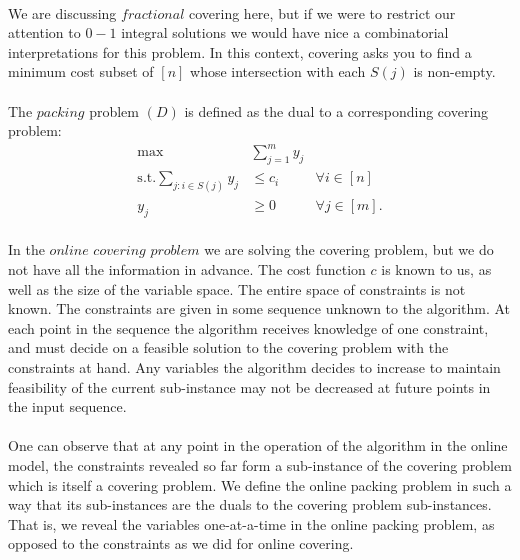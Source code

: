\documentclass[letterpaper,12pt,oneside,onecolumn]{article}
\begin{document}
\paragraph{}
We are discussing $\textit{fractional}$ covering here, but if we were to restrict our attention to $0-1$ integral solutions we would have nice a combinatorial interpretations for this problem. In this context, covering asks you to find a minimum cost subset of $[n]$ whose intersection with each $S(j)$ is non-empty.
\paragraph{}
The $\textit{packing}$ problem $(D)$ is defined as the dual to a corresponding covering problem:
\begin{align*}
\max &\sum_{j=1}^m y_j \\
\text{s.t.} \sum_{j : i \in S(j)} y_j &\leq c_i &\forall i \in [n] \\
y_j &\geq 0 &\forall j \in [m].
\end{align*}
\paragraph{}
In the $\textit{online covering problem}$ we are solving the covering problem, but we do not have all the information in advance. The cost function $c$ is known to us, as well as the size of the variable space. The entire space of constraints is not known. The constraints are given in some sequence unknown to the algorithm. At each point in the sequence the algorithm receives knowledge of one constraint, and must decide on a feasible solution to the covering problem with the constraints at hand. Any variables the algorithm decides to increase to maintain feasibility of the current sub-instance may not be decreased at future points in the input sequence.
\paragraph{}
One can observe that at any point in the operation of the algorithm in the online model, the constraints revealed so far form a sub-instance of the covering problem which is itself a covering problem. We define the online packing problem in such a way that its sub-instances are the duals to the covering problem sub-instances. That is, we reveal the variables one-at-a-time in the online packing problem, as opposed to the constraints as we did for online covering.
\end{document}
